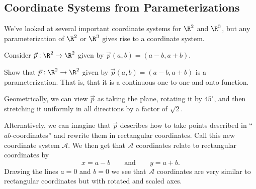 \subsection{Coordinate Systems from Parameterizations}
We've looked at several important coordinate systems for $\R^2$ and $\R^3$,
but any parameterization of $\R^2$ or $\R^3$ gives rise to a coordinate system.

Consider $\vec p:\R^2\to\R^2$ given by $\vec p(a,b)=(a-b,a+b)$.  

\begin{exercise}
	Show that $\vec p:\R^2\to\R^2$ given by $\vec p(a,b)=(a-b,a+b)$ is
	a parameterization.  That is, that it is a continuous 
	one-to-one and onto function.
\end{exercise}

Geometrically, we can view $\vec p$ as taking the plane, rotating it by $45^\circ$,
and then
stretching it uniformly in all directions by a factor of $\sqrt{2}$.

Alternatively, we can imagine that $\vec p$ describes how to take points described
in ``$ab$-coordinates'' and rewrite them in rectangular coordinates.  Call this new coordinate
system $\mathcal A$. We then get that
$\mathcal A$ coordinates relate to rectangular coordinates by
\[
	x=a-b\qquad\text{and}\qquad y=a+b.
\]
Drawing the lines $a=0$ and $b=0$ we see that $\mathcal A$ coordinates are very similar to
rectangular coordinates but with rotated and scaled axes.

